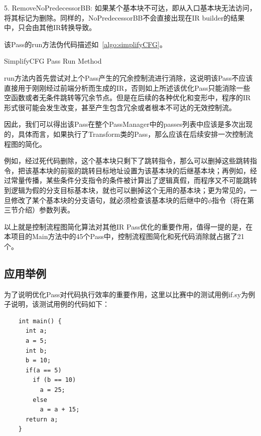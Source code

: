 5. RemoveNoPredecessorBB: 如果某个基本块不可达，即从入口基本块无法访问，将其标记为删除。同样的，NoPredecessorBB不会直接出现在IR builder的结果中，只会由其他IR转换导致。


该Pass的run方法伪代码描述如~\ref{algo:simplifyCFG}。

\begin{algorithm}[htb]
  \small
  \SetAlgoLined

  \caption{SimplifyCFG Pass Run Method}
  \label{algo:simplifyCFG}
\end{algorithm}

run方法内首先尝试对上个Pass产生的冗余控制流进行消除，这说明该Pass不应该直接用于刚刚经过前端分析而生成的IR，否则如上所述该优化Pass只能消除一些空函数或者无条件跳转等冗余节点。但是在后续的各种优化和变形中，程序的IR形式很可能会发生改变，甚至产生包含冗余或者根本不可达的无效控制流。

因此，我们可以得出该Pass在整个PassManager中的passes列表中应该是多次出现的，具体而言，如果执行了Transform类的Pass，那么应该在后续安排一次控制流程图的简化。

例如，经过死代码删除，这个基本块只剩下了跳转指令，那么可以删掉这些跳转指令，把该基本块的前驱的跳转目标地址设置为该基本块的后继基本块；再例如，经过常量传播，某些条件分支指令的条件被计算出了逻辑真假，而程序又不可能跳转到逻辑为假的分支目标基本块，就也可以删掉这个无用的基本块；更为常见的，一旦修改了某个基本块的分支语句，就必须检查该基本块的后继中的$\phi$指令（将在第三节介绍）参数列表。

以上就是控制流程图简化算法对其他IR Pass优化的重要作用，值得一提的是，在本项目的Main方法中的45个Pass中，控制流程图简化和死代码消除就占据了21个。


\subsection{应用举例}

为了说明优化Pass对代码执行效率的重要作用，这里以比赛中的测试用例if.sy为例子说明，该测试用例的代码如下：

\begin{verbatim}
    int main() {
      int a;
      a = 5;
      int b;
      b = 10;
      if(a == 5)
        if (b == 10) 
          a = 25;
        else 
          a = a + 15;
      return a;
    }
\end{verbatim}

